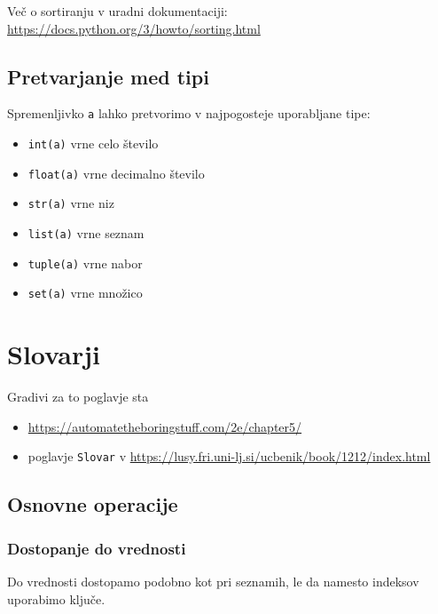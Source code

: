 \documentclass[
]{report}
\providecommand{\tightlist}{%
  \setlength{\itemsep}{0pt}\setlength{\parskip}{0pt}}
\begin{document}
Več o sortiranju v uradni dokumentaciji: \url{https://docs.python.org/3/howto/sorting.html}

\hypertarget{pretvarjanje-med-tipi}{%
\section{Pretvarjanje med tipi}\label{pretvarjanje-med-tipi}}

Spremenljivko \texttt{a} lahko pretvorimo v najpogosteje uporabljane tipe:

\begin{itemize}
\tightlist
\item
  \texttt{int(a)} vrne celo število
\item
  \texttt{float(a)} vrne decimalno število
\item
  \texttt{str(a)} vrne niz
\item
  \texttt{list(a)} vrne seznam
\item
  \texttt{tuple(a)} vrne nabor
\item
  \texttt{set(a)} vrne množico
\end{itemize}

\hypertarget{slovarji}{%
\chapter{Slovarji}\label{slovarji}}

Gradivi za to poglavje sta

\begin{itemize}
\tightlist
\item
  \url{https://automatetheboringstuff.com/2e/chapter5/}
\item
  poglavje \texttt{Slovar} v \url{https://lusy.fri.uni-lj.si/ucbenik/book/1212/index.html}
\end{itemize}

\hypertarget{osnovne-operacije}{%
\section{Osnovne operacije}\label{osnovne-operacije}}

\hypertarget{dostopanje-do-vrednosti}{%
\subsection{Dostopanje do vrednosti}\label{dostopanje-do-vrednosti}}

Do vrednosti dostopamo podobno kot pri seznamih, le da namesto indeksov uporabimo ključe.
\end{document}
